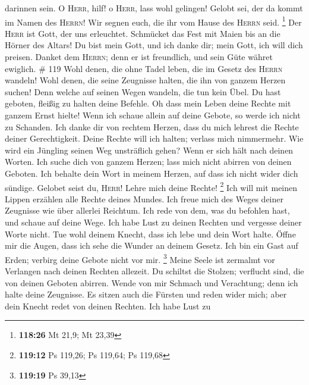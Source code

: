 darinnen sein.  O \textsc{Herr}, hilf! o \textsc{Herr},
lass wohl gelingen!  Gelobt sei, der da kommt im Namen
des \textsc{Herrn}! Wir segnen euch, die ihr vom Hause des
\textsc{Herrn} seid. \footnote{\textbf{118:26} Mt 21,9; Mt 23,39}
 Der \textsc{Herr} ist Gott, der uns erleuchtet.
Schmücket das Fest mit Maien bis an die Hörner des Altars!
 Du bist mein Gott, und ich danke dir; mein Gott, ich
will dich preisen.  Danket dem \textsc{Herrn}; denn er
ist freundlich, und sein Güte währet ewiglich. \# 119 
Wohl denen, die ohne Tadel leben, die im Gesetz des \textsc{Herrn}
wandeln!  Wohl denen, die seine Zeugnisse halten, die ihn
von ganzem Herzen suchen!  Denn welche auf seinen Wegen
wandeln, die tun kein Übel.  Du hast geboten, fleißig zu
halten deine Befehle.  Oh dass mein Leben deine Rechte mit
ganzem Ernst hielte!  Wenn ich schaue allein auf deine
Gebote, so werde ich nicht zu Schanden.  Ich danke dir von
rechtem Herzen, dass du mich lehrest die Rechte deiner Gerechtigkeit.
 Deine Rechte will ich halten; verlass mich nimmermehr.
 Wie wird ein Jüngling seinen Weg unsträflich gehen? Wenn
er sich hält nach deinen Worten.  Ich suche dich von
ganzem Herzen; lass mich nicht abirren von deinen Geboten.
 Ich behalte dein Wort in meinem Herzen, auf dass ich
nicht wider dich sündige.  Gelobet seist du,
\textsc{Herr}! Lehre mich deine Rechte! \footnote{\textbf{119:12} Ps
  119,26; Ps 119,64; Ps 119,68}  Ich will mit meinen
Lippen erzählen alle Rechte deines Mundes.  Ich freue
mich des Weges deiner Zeugnisse wie über allerlei Reichtum.
 Ich rede von dem, was du befohlen hast, und schaue auf
deine Wege.  Ich habe Lust zu deinen Rechten und vergesse
deiner Worte nicht.  Tue wohl deinem Knecht, dass ich
lebe und dein Wort halte.  Öffne mir die Augen, dass ich
sehe die Wunder an deinem Gesetz.  Ich bin ein Gast auf
Erden; verbirg deine Gebote nicht vor mir. \footnote{\textbf{119:19} Ps
  39,13}  Meine Seele ist zermalmt vor Verlangen nach
deinen Rechten allezeit.  Du schiltst die Stolzen;
verflucht sind, die von deinen Geboten abirren.  Wende
von mir Schmach und Verachtung; denn ich halte deine Zeugnisse.
 Es sitzen auch die Fürsten und reden wider mich; aber
dein Knecht redet von deinen Rechten.  Ich habe Lust zu
